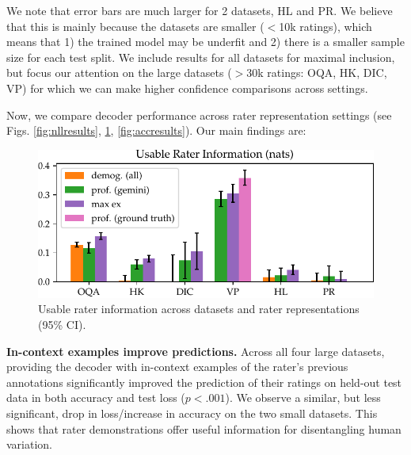 \documentclass[11pt]{article}
\begin{document}
We note that error bars are much larger for 2 datasets, HL and PR. We believe that this is mainly because the datasets are smaller ($<$10k ratings), which means that 1) the trained model may be underfit and 2) there is a smaller sample size for each test split. We include results for all datasets for maximal inclusion, but focus our attention on the large datasets ($>$30k ratings: OQA, HK, DIC, VP) for which we can make higher confidence comparisons across settings.

Now, we compare decoder performance across rater representation settings (see Figs. \ref{fig:nllresults}, \ref{fig:rater_info},  \ref{fig:accresults}).
Our main findings are:

\begin{figure}
\centering
\vspace{-5pt}  %
\includegraphics[width=0.75\columnwidth]{files/rater_info.pdf}

\caption{
Usable rater information across datasets and rater representations (95\% CI).
}
\label{fig:rater_info}
\vspace{-10pt}
\end{figure}

\textbf{In-context examples improve predictions.} 
Across all four large datasets, providing the decoder with in-context examples of the rater's previous annotations significantly improved the prediction of their ratings on held-out test data in both accuracy and test loss ($p<.001$).
We observe a similar, but less significant, drop in loss/increase in accuracy on the two small datasets.
This shows that rater demonstrations offer useful information for disentangling human variation.
\end{document}
